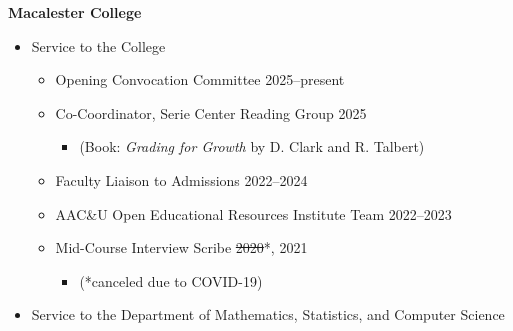 \documentclass[margin]{res}
\begin{document}
\begin{resume}
\textbf{Macalester College}
	\begin{itemize} %
	
	\item Service to the College
		\begin{itemize}
		
		\item Opening Convocation Committee \hfill 2025--present
		
		\item Co-Coordinator, Serie Center Reading Group  \hfill 2025
			\begin{itemize}[leftmargin=-0in] \vspace{-0.2cm}
			\item[] \begin{footnotesize}(Book: \textit{Grading for Growth} by D. Clark and R. Talbert) \end{footnotesize}
			\end{itemize} 
		
		\item Faculty Liaison to Admissions \hfill 2022--2024 %
		
		\item AAC\&U Open Educational Resources Institute Team \hfill 2022--2023
		
		\item Mid-Course Interview Scribe \hfill \sout{2020}*, 2021 
			\begin{itemize}[leftmargin=-0in] \vspace{-0.2cm}
			\item[] \begin{footnotesize} (*canceled due to COVID-19) \end{footnotesize}
			\end{itemize}
		
		
		
		
		\end{itemize}
		
	\item Service to the Department of Mathematics, Statistics, and Computer Science
		\begin{itemize}
		

\end{itemize}
\end{itemize}
\end{resume}
\end{document}
